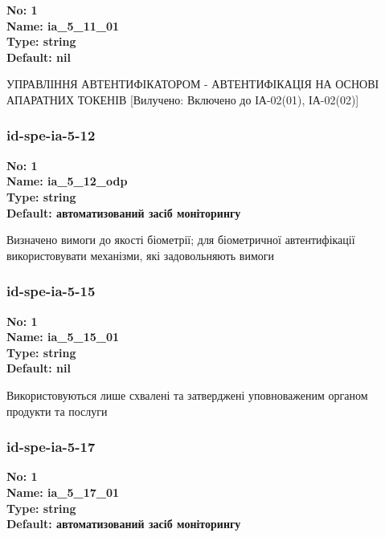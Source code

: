 \documentclass{article}
\begin{document}
\vspace{10pt}
{\footnotesize\bfseries
No: 1\\
Name: ia\_\allowbreak{}5\_\allowbreak{}11\_\allowbreak{}01\\
Type: string\\
Default: nil
}

{\footnotesize УПРАВЛІННЯ АВТЕНТИФІКАТОРОМ - АВТЕНТИФІКАЦІЯ НА ОСНОВІ АПАРАТНИХ ТОКЕНІВ [Вилучено: Включено до ІА-02(01), ІА-02(02)]}




\subsubsection{id-spe-ia-5-12}


\vspace{10pt}
{\footnotesize\bfseries
No: 1\\
Name: ia\_\allowbreak{}5\_\allowbreak{}12\_\allowbreak{}odp\\
Type: string\\
Default: \textquotedbl{}автоматизований засіб моніторингу\textquotedbl{}
}

{\footnotesize Визначено вимоги до якості біометрії; для біометричної автентифікації використовувати механізми, які задовольняють вимоги}




\subsubsection{id-spe-ia-5-15}


\vspace{10pt}
{\footnotesize\bfseries
No: 1\\
Name: ia\_\allowbreak{}5\_\allowbreak{}15\_\allowbreak{}01\\
Type: string\\
Default: nil
}

{\footnotesize Використовуються лише схвалені та затверджені уповноваженим органом продукти та послуги}




\subsubsection{id-spe-ia-5-17}


\vspace{10pt}
{\footnotesize\bfseries
No: 1\\
Name: ia\_\allowbreak{}5\_\allowbreak{}17\_\allowbreak{}01\\
Type: string\\
Default: \textquotedbl{}автоматизований засіб моніторингу\textquotedbl{}
}
\end{document}
